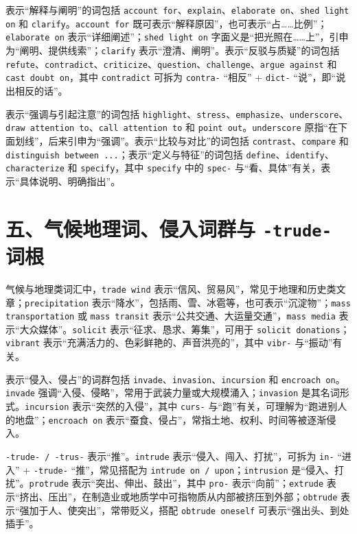 \documentclass[UTF8,zihao=-4]{ctexart}
\begin{document}
表示“解释与阐明”的词包括 \texttt{account for}、\texttt{explain}、\texttt{elaborate on}、\texttt{shed light on} 和 \texttt{clarify}。\texttt{account for} 既可表示“解释原因”，也可表示“占……比例”；\texttt{elaborate on} 表示“详细阐述”；\texttt{shed light on} 字面义是“把光照在……上”，引申为“阐明、提供线索”；\texttt{clarify} 表示“澄清、阐明”。表示“反驳与质疑”的词包括 \texttt{refute}、\texttt{contradict}、\texttt{criticize}、\texttt{question}、\texttt{challenge}、\texttt{argue against} 和 \texttt{cast doubt on}，其中 \texttt{contradict} 可拆为 \texttt{contra-} “相反” + \texttt{dict-} “说”，即“说出相反的话”。

表示“强调与引起注意”的词包括 \texttt{highlight}、\texttt{stress}、\texttt{emphasize}、\texttt{underscore}、\texttt{draw attention to}、\texttt{call attention to} 和 \texttt{point out}。\texttt{underscore} 原指“在下面划线”，后来引申为“强调”。表示“比较与对比”的词包括 \texttt{contrast}、\texttt{compare} 和 \texttt{distinguish between ...}；表示“定义与特征”的词包括 \texttt{define}、\texttt{identify}、\texttt{characterize} 和 \texttt{specify}，其中 \texttt{specify} 中的 \texttt{spec-} 与“看、具体”有关，表示“具体说明、明确指出”。

\section*{五、气候地理词、侵入词群与 \texttt{-trude-} 词根}

气候与地理类词汇中，\texttt{trade wind} 表示“信风、贸易风”，常见于地理和历史类文章；\texttt{precipitation} 表示“降水”，包括雨、雪、冰雹等，也可表示“沉淀物”；\texttt{mass transportation} 或 \texttt{mass transit} 表示“公共交通、大运量交通”，\texttt{mass media} 表示“大众媒体”。\texttt{solicit} 表示“征求、恳求、筹集”，可用于 \texttt{solicit donations}；\texttt{vibrant} 表示“充满活力的、色彩鲜艳的、声音洪亮的”，其中 \texttt{vibr-} 与“振动”有关。

表示“侵入、侵占”的词群包括 \texttt{invade}、\texttt{invasion}、\texttt{incursion} 和 \texttt{encroach on}。\texttt{invade} 强调“入侵、侵略”，常用于武装力量或大规模涌入；\texttt{invasion} 是其名词形式。\texttt{incursion} 表示“突然的入侵”，其中 \texttt{curs-} 与“跑”有关，可理解为“跑进别人的地盘”；\texttt{encroach on} 表示“蚕食、侵占”，常指土地、权利、时间等被逐渐侵入。

\texttt{-trude- / -trus-} 表示“推”。\texttt{intrude} 表示“侵入、闯入、打扰”，可拆为 \texttt{in-} “进入” + \texttt{-trude-} “推”，常见搭配为 \texttt{intrude on / upon}；\texttt{intrusion} 是“侵入、打扰”。\texttt{protrude} 表示“突出、伸出、鼓出”，其中 \texttt{pro-} 表示“向前”；\texttt{extrude} 表示“挤出、压出”，在制造业或地质学中可指物质从内部被挤压到外部；\texttt{obtrude} 表示“强加于人、使突出”，常带贬义，搭配 \texttt{obtrude oneself} 可表示“强出头、到处插手”。
\end{document}
